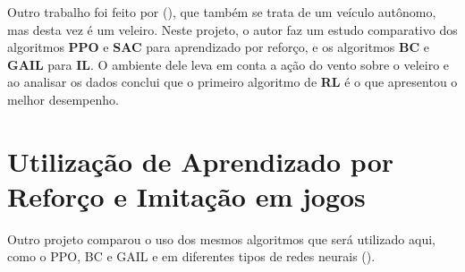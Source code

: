 Outro trabalho foi feito por (), que também se trata de um veículo autônomo, mas desta vez é um veleiro. Neste projeto, o autor faz um estudo comparativo dos algoritmos \textbf{PPO} e \textbf{SAC} para aprendizado por reforço, e os algoritmos \textbf{BC} e \textbf{GAIL} para \textbf{IL}. O ambiente dele leva em conta a ação do vento sobre o veleiro e ao analisar os dados conclui que o primeiro algoritmo de \textbf{RL} é o que apresentou o melhor desempenho.

\section*{Utilização de Aprendizado por Reforço e Imitação em jogos}
Outro projeto comparou o uso dos mesmos algoritmos que será utilizado aqui, como o PPO, BC e GAIL e em diferentes tipos de redes neurais (). 
